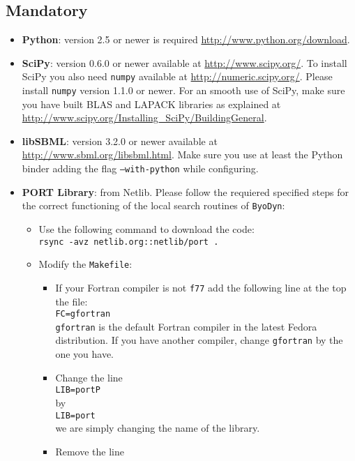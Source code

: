 \documentclass[a4paper, 11pt]{article}
\begin{document}
\subsection{Mandatory} \label{mandatory}
\begin{itemize}
\item
  \textbf{Python}: version 2.5 or newer is required \url{http://www.python.org/download}.
\item
  \textbf{SciPy}: version 0.6.0 or newer available at \url{http://www.scipy.org/}.
  To install SciPy you also need \texttt{numpy} available at \url{http://numeric.scipy.org/}.
  Please install \texttt{numpy} version 1.1.0 or newer.
  For an smooth use of SciPy, make sure you have built BLAS and LAPACK libraries as explained at \url{http://www.scipy.org/Installing_SciPy/BuildingGeneral}.
\item
  \textbf{libSBML}: version 3.2.0 or newer available at \url{http://www.sbml.org/libsbml.html}.
  Make sure you use at least the Python binder adding the flag \texttt{--with-python} while configuring.
\item
  \textbf{PORT Library}: from Netlib. 
  Please follow the requiered specified steps for the correct functioning of the local search routines of \texttt{ByoDyn}:
  \begin{itemize}
  \item 
    Use the following command to download the code:\\\texttt{rsync -avz netlib.org::netlib/port .}
  \item
    Modify the \texttt{Makefile}:
    \begin{itemize}
    \item
      If your Fortran compiler is not \texttt{f77} add the following line at the top the file:\\[1.5ex]
      \texttt{FC=gfortran}\\[1.5ex]
      \texttt{gfortran} is the default Fortran compiler in the latest Fedora distribution.
      If you have another compiler, change \texttt{gfortran} by the one you have.
    \item
      Change the line\\[1.5ex]
      \texttt{LIB=portP}\\[1.5ex]
      by \\[1.5ex]
      \texttt{LIB=port}\\[1.5ex]
      we are simply changing the name of the library.
    \item
      Remove the line\\[1.5ex]

\end{itemize}
\end{itemize}
\end{itemize}
\end{document}
